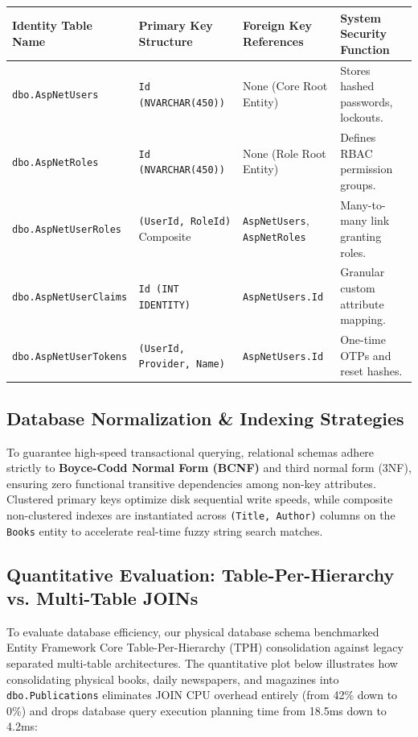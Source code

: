 \documentclass[10pt,journal,compsoc]{IEEEtran}
\begin{document}
\vspace{10pt}
\noindent
\begin{center}
\renewcommand{\arraystretch}{1.25}
\begin{tabular}{|L{3.6cm}|L{3.4cm}|L{3.8cm}|L{4.2cm}|}
\hline
{}
\textbf{\color{white}Identity Table Name} & \textbf{\color{white}Primary Key Structure} & \textbf{\color{white}Foreign Key References} & \textbf{\color{white}System Security Function} \\
\hline
\texttt{dbo.AspNetUsers} & \texttt{Id (NVARCHAR(450))} & None (Core Root Entity) & Stores hashed passwords, lockouts. \\
\hline
{}
\texttt{dbo.AspNetRoles} & \texttt{Id (NVARCHAR(450))} & None (Role Root Entity) & Defines RBAC permission groups. \\
\hline
\texttt{dbo.AspNetUserRoles} & \texttt{(UserId, RoleId)} Composite & \texttt{AspNetUsers}, \texttt{AspNetRoles} & Many-to-many link granting roles. \\
\hline
{}
\texttt{dbo.AspNetUserClaims} & \texttt{Id (INT IDENTITY)} & \texttt{AspNetUsers.Id} & Granular custom attribute mapping. \\
\hline
\texttt{dbo.AspNetUserTokens} & \texttt{(UserId, Provider, Name)} & \texttt{AspNetUsers.Id} & One-time OTPs and reset hashes. \\
\hline
\end{tabular}
\end{center}

\subsection{Database Normalization \& Indexing Strategies}
To guarantee high-speed transactional querying, relational schemas adhere strictly to \textbf{Boyce-Codd Normal Form (BCNF)} and third normal form (3NF), ensuring zero functional transitive dependencies among non-key attributes. Clustered primary keys optimize disk sequential write speeds, while composite non-clustered indexes are instantiated across \texttt{(Title, Author)} columns on the \texttt{Books} entity to accelerate real-time fuzzy string search matches.

\subsection{Quantitative Evaluation: Table-Per-Hierarchy vs. Multi-Table JOINs}
To evaluate database efficiency, our physical database schema benchmarked Entity Framework Core Table-Per-Hierarchy (TPH) consolidation against legacy separated multi-table architectures. The quantitative plot below illustrates how consolidating physical books, daily newspapers, and magazines into \texttt{dbo.Publications} eliminates JOIN CPU overhead entirely (from 42\% down to 0\%) and drops database query execution planning time from 18.5ms down to 4.2ms:
\end{document}
